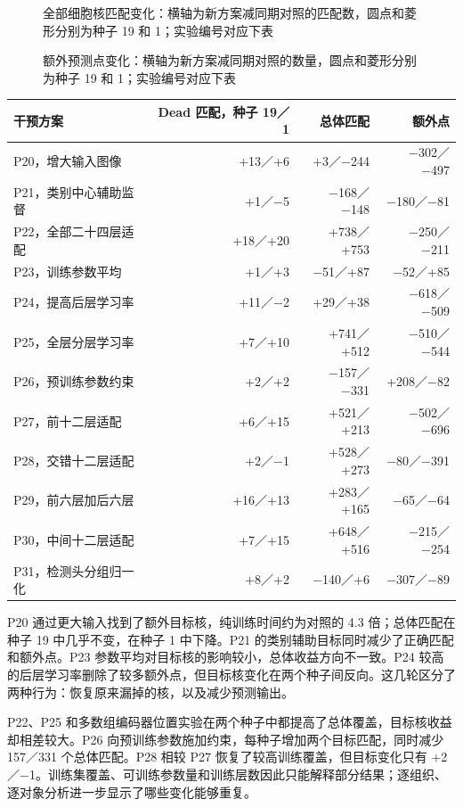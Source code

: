 \documentclass[
  11pt,
  fontset=fandol]{ctexart}
\newcounter{none} %
\begin{document}
\begin{figure}[H]\centering

\caption{全部细胞核匹配变化：横轴为新方案减同期对照的匹配数，圆点和菱形分别为种子 19 和 1；实验编号对应下表}
\end{figure}

\begin{figure}[H]\centering

\caption{额外预测点变化：横轴为新方案减同期对照的数量，圆点和菱形分别为种子 19 和 1；实验编号对应下表}
\end{figure}

{\def\LTcaptype{none} %
\begin{longtable}[]{@{}lrrr@{}}
\toprule\noalign{}
干预方案 & Dead 匹配，种子 19／1 & 总体匹配 & 额外点 \\
\midrule\noalign{}
\endhead
\bottomrule\noalign{}
\endlastfoot
P20，增大输入图像 & +13／+6 & +3／−244 & −302／−497 \\
P21，类别中心辅助监督 & +1／−5 & −168／−148 & −180／−81 \\
P22，全部二十四层适配 & +18／+20 & +738／+753 & −250／−211 \\
P23，训练参数平均 & +1／+3 & −51／+87 & −52／+85 \\
P24，提高后层学习率 & +11／−2 & +29／+38 & −618／−509 \\
P25，全层分层学习率 & +7／+10 & +741／+512 & −510／−544 \\
P26，预训练参数约束 & +2／+2 & −157／−331 & +208／−82 \\
P27，前十二层适配 & +6／+15 & +521／+213 & −502／−696 \\
P28，交错十二层适配 & +2／−1 & +528／+273 & −80／−391 \\
P29，前六层加后六层 & +16／+13 & +283／+165 & −65／−64 \\
P30，中间十二层适配 & +7／+15 & +648／+516 & −215／−254 \\
P31，检测头分组归一化 & +8／+2 & −140／+6 & −307／−89 \\
\end{longtable}
}

P20 通过更大输入找到了额外目标核，纯训练时间约为对照的 4.3
倍；总体匹配在种子 19 中几乎不变，在种子 1 中下降。P21
的类别辅助目标同时减少了正确匹配和额外点。P23
参数平均对目标核的影响较小，总体收益方向不一致。P24
较高的后层学习率删除了较多额外点，但目标核变化在两个种子间反向。这几轮区分了两种行为：恢复原来漏掉的核，以及减少预测输出。

P22、P25
和多数组编码器位置实验在两个种子中都提高了总体覆盖，目标核收益却相差较大。P26
向预训练参数施加约束，每种子增加两个目标匹配，同时减少 157／331
个总体匹配。P28 相较 P27 恢复了较高训练覆盖，但目标变化只有
+2／−1。训练集覆盖、可训练参数量和训练层数因此只能解释部分结果；逐组织、逐对象分析进一步显示了哪些变化能够重复。
\end{document}
